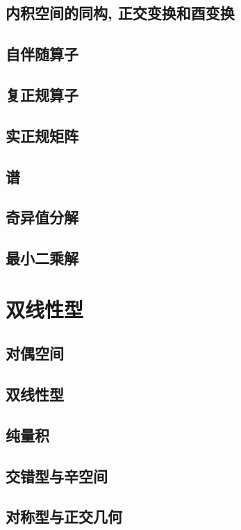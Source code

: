 \documentclass[a4paper, 11pt]{ctexbook}
\begin{document}
        \section{内积空间的同构, 正交变换和酉变换}
        \section{自伴随算子}
        \section{复正规算子}
        \section{实正规矩阵}
        \section{谱}
        \section{奇异值分解}
        \section{最小二乘解}
    \chapter{双线性型}
        \section{对偶空间}
        \section{双线性型}
        \section{纯量积}
        \section{交错型与辛空间}
        \section{对称型与正交几何}
\end{document}
